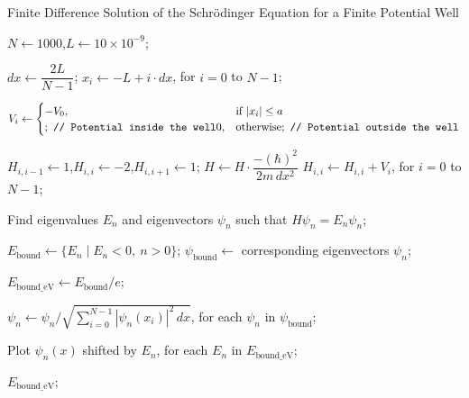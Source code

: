 \begin{algorithm}[H]
    \caption{Finite Difference Solution of the Schrödinger Equation for a Finite Potential Well}
    \label{alg:schrodinger_equation}

    $N \gets 1000$,\quad $L \gets 10 \times 10^{-9}$;

    $dx \gets \dfrac{2L}{N - 1}$;
    $x_i \gets -L + i \cdot dx$, \quad for $i = 0$ to $N - 1$;

    $V_i \gets \begin{cases}
            -V_0, & \text{if } |x_i| \leq a                               \\ \tcp*[r]{Potential inside the well}
            0,    & \text{otherwise} \tcp*[r]{Potential outside the well}
        \end{cases}$\;

     {
        $H_{i,i-1} \gets 1$,\quad $H_{i,i} \gets -2$,\quad $H_{i,i+1} \gets 1$;
    }
    $H \gets H \cdot \dfrac{-(\hbar)^2}{2m\, dx^2}$
    $H_{i,i} \gets H_{i,i} + V_i$, \quad for $i = 0$ to $N - 1$;

    Find eigenvalues $E_n$ and eigenvectors $\psi_n$ such that $H \psi_n = E_n \psi_n$;

    $E_{\text{bound}} \gets \{ E_n \mid E_n < 0,\ n > 0 \}$;
    $\psi_{\text{bound}} \gets$ corresponding eigenvectors $\psi_n$;

    $E_{\text{bound\_eV}} \gets E_{\text{bound}} / e$;

    $\psi_n \gets \psi_n / \sqrt{\sum_{i=0}^{N-1} |\psi_n(x_i)|^2\, dx}$, \quad for each $\psi_n$ in $\psi_{\text{bound}}$;

    Plot $\psi_n(x)$ shifted by $E_n$, \quad for each $E_n$ in $E_{\text{bound\_eV}}$;

    \Return $E_{\text{bound\_eV}}$;
\end{algorithm}




